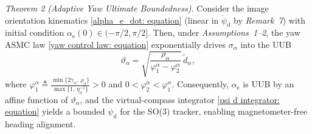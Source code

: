 \textit{Theorem 2 (Adaptive Yaw Ultimate Boundedness).}
Consider the image orientation kinematics \eqref{alpha_e_dot: equation} (linear in $\dot{\psi}_\text{d}$ by \textit{Remark~7}) with initial condition $\alpha_\text{e}(0)\in(-\pi/2,\pi/2]$. Then, under \textit{Assumptions~1--2}, the yaw ASMC law \eqref{yaw control law: equation} exponentially drives $\sigma_\alpha$ into the UUB
\begin{equation} \label{yaw UUB bound: equation}
    \vartheta_\alpha = \sqrt{\frac{\rho_\alpha}{\varphi_1^\alpha-\varphi_2^\alpha}}\,\tilde{d}_\alpha,
\end{equation}
where $\varphi_1^\alpha \triangleq \frac{\min\{2\gamma_\alpha,\,\rho_\alpha\}}{\max\{1,\,\eta_\alpha^{-1}\}}>0$ and $0<\varphi_2^\alpha<\varphi_1^\alpha$. Consequently, $\alpha_\text{e}$ is UUB by an affine function of $\vartheta_\alpha$, and the virtual-compass integrator \eqref{psi d integrator: equation} yields a bounded $\psi_\text{d}$ for the SO(3) tracker, enabling magnetometer-free heading alignment.

